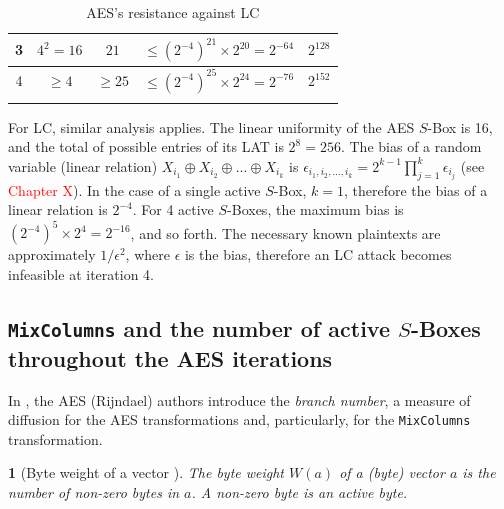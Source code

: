 \documentclass{report}
\newtheorem*{concept}{}{\bfseries}{\itshape}
\begin{document}
\begin{longtable}[c]{|c|c|c|c|c|}
3                   & $4^2 = 16$                                                                              & $21$                                                                            & $\leq (2^{-4})^{21}\times2^{20} = 2^{-64}$                                          & $2^{128}$                                                                      \\ \hline
4                   & $\geq 4$                                                                                & $\geq 25$                                                                       & $\leq (2^{-4})^{25}\times2^{24} = 2^{-76}$                                          & $2^{152}$                                                                      \\ \hline
\caption{AES's resistance against LC}
\label{tbl:aes-lc}
\end{longtable}

For LC, similar analysis applies. The linear uniformity of the AES $S$-Box is 16, and the total of possible entries of its LAT is $2^8 = 256$. The bias of a random variable (linear relation) $X_{i_1} \oplus X_{i_2} \oplus ... \oplus X_{i_k}$ is $\epsilon_{i_1, i_2, ..., i_k} = 2^{k-1} \prod_{j=1}^{k} \epsilon_{i_j}$ (see \textcolor{red}{Chapter X}). In the case of a single active $S$-Box, $k = 1$, therefore the bias of a linear relation is $2^{-4}$. For 4 active $S$-Boxes, the maximum bias is $(2^{-4})^5\times2^4 = 2^{-16}$, and so forth. The necessary known plaintexts are approximately $1/\epsilon^2$, where $\epsilon$ is the bias, therefore an LC attack becomes infeasible at iteration 4.

\subsection{\texttt{MixColumns} and the number of active $S$-Boxes throughout the AES iterations}\label{sec:mc-and-diffusion}

In \cite{RijndaelProposal}, the AES (Rijndael) authors introduce the \emph{branch number}, a measure of diffusion for the AES transformations and, particularly, for the \texttt{MixColumns} transformation.

\begin{concept}[Byte weight of a vector \cite{RijndaelProposal}]
The byte weight $W(a)$ of a (byte) vector $a$ is the number of non-zero bytes in $a$. A non-zero byte is an \emph{active} byte.
\end{concept}
\end{document}
